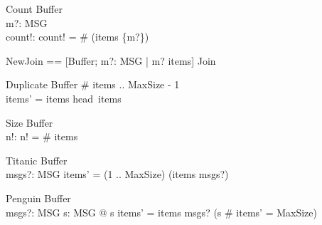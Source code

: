 \documentclass{article}
\begin{document}
\begin{schema}{Count}
  \Xi Buffer\\
  m?: MSG\\
  count!: \nat
\where
  count! = \# (items \rres  \{m?\})
\end{schema}

\begin{zed}
NewJoin == [\Xi Buffer; m?: MSG | m? \notin  \ran  items] \land  Join
\end{zed}

\begin{schema}{Duplicate}
  \Delta Buffer
\where
  \# items  .. MaxSize - 1\\
  items' = items \cat  \langle head~items\rangle
\end{schema}

\begin{schema}{Size}
  \Xi Buffer\\
  n!: \nat
\where
  n! = \# items
\end{schema}

\begin{schema}{Titanic}
  \Delta Buffer\\
  msgs?: \seq  MSG
\where
  items' = (1 .. MaxSize) \dres  (items \cat  msgs?)
\end{schema}

\begin{schema}{Penguin}
  \Delta Buffer\\
  msgs?: \seq  MSG
\where
  \exists  s: \seq  MSG @ s \cat  items' = items \cat  msgs? \land  (s \neq  \langle \rangle  \implies  \# items' = MaxSize)
\end{schema}
\end{document}
